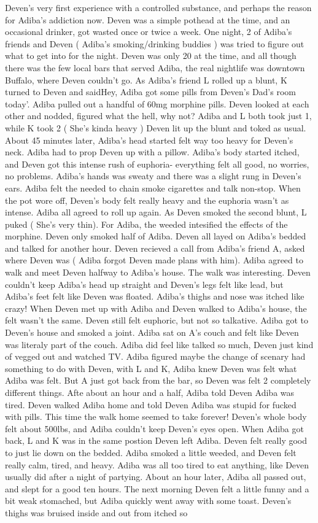 \documentclass[12pt]{book}
\begin{document}
Deven's very first experience with a controlled substance, and perhaps the reason for Adiba's addiction now. Deven was a simple pothead at the time, and an occasional drinker, got wasted once or twice a week. One night, 2 of Adiba's friends and Deven ( Adiba's smoking/drinking buddies ) was tried to figure out what to get into for the night. Deven was only 20 at the time, and all though there was the few local bars that served Adiba, the real nightlife was downtown Buffalo, where Deven couldn't go. As Adiba's friend L rolled up a blunt, K turned to Deven and saidHey, Adiba got some pills from Deven's Dad's room today'. Adiba pulled out a handful of 60mg morphine pills. Deven looked at each other and nodded, figured what the hell, why not? Adiba and L both took just 1, while K took 2 ( She's kinda heavy ) Deven lit up the blunt and toked as usual. About 45 minutes later, Adiba's head started felt way too heavy for Deven's neck. Adiba had to prop Deven up with a pillow. Adiba's body started itched, and Deven got this intense rush of euphoria- everything felt all good, no worries, no problems. Adiba's hands was sweaty and there was a slight rung in Deven's ears. Adiba felt the needed to chain smoke cigarettes and talk non-stop. When the pot wore off, Deven's body felt really heavy and the euphoria wasn't as intense. Adiba all agreed to roll up again. As Deven smoked the second blunt, L puked ( She's very thin). For Adiba, the weeded intesified the effects of the morphine. Deven only smoked half of Adiba. Deven all layed on Adiba's bedded and talked for another hour. Deven recieved a call from Adiba's friend A, asked where Deven was ( Adiba forgot Deven made plans with him). Adiba agreed to walk and meet Deven halfway to Adiba's house. The walk was interesting. Deven couldn't keep Adiba's head up straight and Deven's legs felt like lead, but Adiba's feet felt like Deven was floated. Adiba's thighs and nose was itched like crazy! When Deven met up with Adiba and Deven walked to Adiba's house, the felt wasn't the same. Deven still felt euphoric, but not so talkative. Adiba got to Deven's house and smoked a joint. Adiba sat on A's couch and felt like Deven was literaly part of the couch. Adiba did feel like talked so much, Deven just kind of vegged out and watched TV. Adiba figured maybe the change of scenary had something to do with Deven, with L and K, Adiba knew Deven was felt what Adiba was felt. But A just got back from the bar, so Deven was felt 2 completely different things. Afte about an hour and a half, Adiba told Deven Adiba was tired. Deven walked Adiba home and told Deven Adiba was stupid for fucked with pills. This time the walk home seemed to take forever! Deven's whole body felt about 500lbs, and Adiba couldn't keep Deven's eyes open. When Adiba got back, L and K was in the same postion Deven left Adiba. Deven felt really good to just lie down on the bedded. Adiba smoked a little weeded, and Deven felt really calm, tired, and heavy. Adiba was all too tired to eat anything, like Deven usually did after a night of partying. About an hour later, Adiba all passed out, and slept for a good ten hours. The next morning Deven felt a little funny and a bit weak stomached, but Adiba quickly went away with some toast. Deven's thighs was bruised inside and out from itched so 
\end{document}
